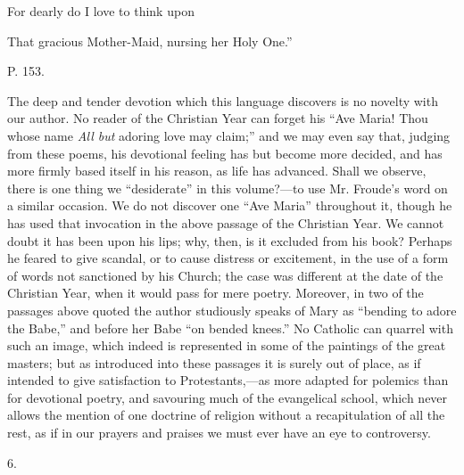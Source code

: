 For dearly do I love to think upon

That gracious Mother-Maid, nursing her Holy One.''

P. 153.

The deep and tender devotion which this language
discovers is no novelty with our author. No reader of the Christian
Year can forget his ``Ave Maria! Thou whose name \emph{All but} adoring
love may claim;'' and we may even say that, judging from these poems,
his devotional feeling has but become more decided, and has more
firmly based itself in his reason, as life has advanced. Shall we
observe, there is one thing we ``desiderate'' in this volume?—to
use Mr. Froude's word on a similar occasion. We do not discover one ``Ave
Maria'' throughout it, though he has used that invocation in the above
passage of the Christian Year. We cannot doubt it has been upon his
lips; why, then, is it excluded from his book? Perhaps he feared to
give scandal, or to cause distress or excitement, in the use of a form
of words not sanctioned by his Church; the case was different at the
date of the Christian Year, when it would pass for mere poetry.
Moreover, in two of the passages above quoted the author studiously
speaks of Mary as ``bending to adore the Babe,'' and before her Babe ``on
bended knees.'' No Catholic can quarrel with such an image, which
indeed is represented in some of the paintings of the great masters;
but as introduced into these passages it is surely out of place, as if
intended to give satisfaction to Protestants,—as more adapted for
polemics than for devotional poetry, and savouring much of the
evangelical school, which never allows the mention of one doctrine of
religion without a recapitulation of all the rest, as if in our
prayers and praises we must ever have an eye to controversy.

6.

